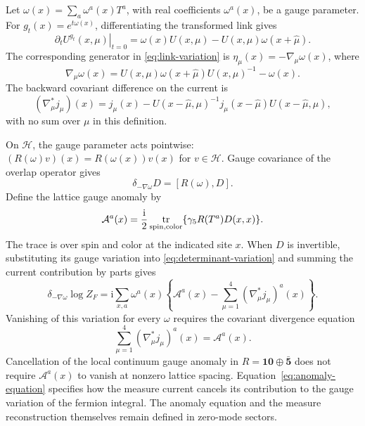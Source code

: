 \documentclass[11pt,a4paper]{article}
\theoremstyle{remark}
\DeclareMathOperator{\tr}{tr}
\newcommand{\ii}{\mathrm i}
\begin{document}
Let \(\omega(x)=\sum_a\omega^a(x)T^a\), with real
coefficients \(\omega^a(x)\), be a gauge parameter.
For \(g_t(x)=e^{t\omega(x)}\), differentiating the transformed
link gives
\begin{equation}
 \left.\partial_tU^{g_t}(x,\mu)\right|_{t=0}
 =\omega(x)U(x,\mu)-U(x,\mu)\omega(x+\hat\mu).
\end{equation}
The corresponding generator in \eqref{eq:link-variation} is
\(\eta_\mu(x)=-\nabla_\mu\omega(x)\), where
\begin{equation}
 \nabla_\mu\omega(x)
 =U(x,\mu)\omega(x+\hat\mu)U(x,\mu)^{-1}-\omega(x).
 \label{eq:forward-difference}
\end{equation}
The backward covariant difference on the current is
\begin{equation}
 (\nabla_\mu^*j_\mu)(x)
 =j_\mu(x)-U(x-\hat\mu,\mu)^{-1}
             j_\mu(x-\hat\mu)U(x-\hat\mu,\mu),
 \label{eq:backward-difference}
\end{equation}
with no sum over \(\mu\) in this definition.

On \(\mathcal H\), the gauge parameter acts pointwise:
\((R(\omega)v)(x)=R(\omega(x))v(x)\) for \(v\in\mathcal H\).
Gauge covariance of the overlap operator gives
\begin{equation}
 \delta_{-\nabla\omega}D=[R(\omega),D].
\end{equation}
Define the lattice gauge anomaly by
\begin{equation}
 \mathcal A^a(x)=\frac{\ii}{2}
 \tr_{\rm spin,color}\{\gamma_5R(T^a)D(x,x)\}.
\end{equation}
The trace is over spin and color at the indicated site \(x\).
When \(D\) is invertible, substituting its gauge variation
into \eqref{eq:determinant-variation} and summing the
current contribution by parts gives
\begin{equation}
 \delta_{-\nabla\omega}\log Z_F
 =\ii\sum_{x,a}\omega^a(x)
 \left\{\mathcal A^a(x)
       -\sum_{\mu=1}^4(\nabla_\mu^*j_\mu)^a(x)\right\}.
 \label{eq:gauge-determinant-variation}
\end{equation}
Vanishing of this variation for every \(\omega\) requires
the covariant divergence equation
\begin{equation}
 \sum_{\mu=1}^4(\nabla_\mu^*j_\mu)^a(x)=\mathcal A^a(x).
 \label{eq:anomaly-equation}
\end{equation}
Cancellation of the local continuum gauge anomaly in
\(R=\mathbf{10}\oplus\bar{\mathbf5}\) does not require
\(\mathcal A^a(x)\) to vanish at nonzero lattice spacing.
Equation~\eqref{eq:anomaly-equation} specifies how the
measure current cancels its contribution to the gauge
variation of the fermion integral.
The anomaly equation and the measure reconstruction
themselves remain defined in zero-mode sectors.
\end{document}
